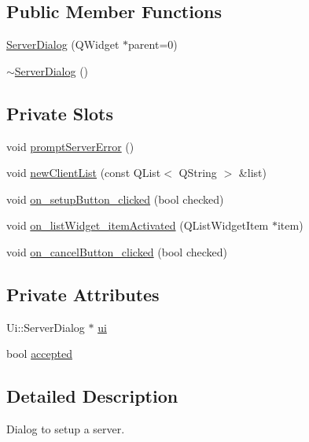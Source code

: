 \subsection*{Public Member Functions}
\begin{DoxyCompactItemize}
\item 
\hyperlink{classServerDialog_af2ce13bfa5d8c5d51695aaafeed1015e}{Server\+Dialog} (Q\+Widget $\ast$parent=0)
\item 
\hyperlink{classServerDialog_a05ac011efd88d4ae6f0965f7b6d3606d}{$\sim$\+Server\+Dialog} ()
\end{DoxyCompactItemize}
\subsection*{Private Slots}
\begin{DoxyCompactItemize}
\item 
void \hyperlink{classServerDialog_ad3dd1d4c4c0bbd790c21c41702bdb3c9}{prompt\+Server\+Error} ()
\item 
void \hyperlink{classServerDialog_afe38cb4103f879fc1aafffaac4be06f9}{new\+Client\+List} (const Q\+List$<$ Q\+String $>$ \&list)
\item 
void \hyperlink{classServerDialog_a54dea0fe00243a6bf5ee03069e8247b5}{on\+\_\+setup\+Button\+\_\+clicked} (bool checked)
\item 
void \hyperlink{classServerDialog_a680d9012866d27c050f1bb9a2f2c5088}{on\+\_\+list\+Widget\+\_\+item\+Activated} (Q\+List\+Widget\+Item $\ast$item)
\item 
void \hyperlink{classServerDialog_aae95a7d694dddaf6a8a66700e76e7fa5}{on\+\_\+cancel\+Button\+\_\+clicked} (bool checked)
\end{DoxyCompactItemize}
\subsection*{Private Attributes}
\begin{DoxyCompactItemize}
\item 
Ui\+::\+Server\+Dialog $\ast$ \hyperlink{classServerDialog_afa306742f46527a5a8aa54cf0e7ad3f5}{ui}
\item 
bool \hyperlink{classServerDialog_ac8aacc54e1f14195f5432c6d8983bd5c}{accepted}
\end{DoxyCompactItemize}


\subsection{Detailed Description}
Dialog to setup a server. 

